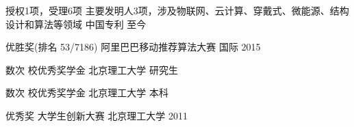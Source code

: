 




\begin{cvhonors}

\cvhonor
{授权1项，受理6项} %
{主要发明人3项，涉及物联网、云计算、穿戴式、微能源、结构设计和算法等领域} %
{中国专利} %
{至今} %

\cvhonor
{优胜奖(排名 53/7186)} %
{阿里巴巴移动推荐算法大赛} %
{ 国际} %
{2015} %

\cvhonor
{数次} %
{校优秀奖学金} %
{北京理工大学} %
{研究生} %


\cvhonor
{数次} %
{校优秀奖学金} %
{北京理工大学} %
{本科} %


\cvhonor
{优秀奖} %
{大学生创新大赛} %
{北京理工大学} %
{2011} %









\end{cvhonors}
